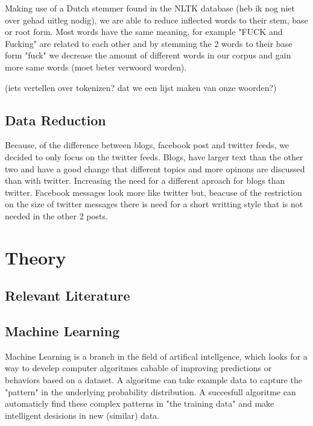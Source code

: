 \documentclass[11pt]{article}
\begin{document}
Making use of a Dutch stemmer found in the NLTK database (heb ik nog niet over gehad uitleg nodig), we are able to reduce inflected words to their stem, base or root form. Most words have the same meaning, for example "FUCK and Fucking"  are related to each other and by stemming the 2 words to their base form "fuck"  we decrease the amount of different words in our corpus and gain more same words (moet beter verwoord worden).

(iets vertellen over tokenizen? dat we een lijst maken van onze woorden?)

\subsection{Data Reduction}
Because, of the difference between blogs, facebook post and twitter feeds, we decided to only focus on the twitter feeds. 
Blogs, have larger text than the other two and have a good change that different topics and more opinons are discussed than with twitter. Increasing the need for a different aproach for blogs than twitter. 
Facebook messages look more like twitter but, beacuse of the restriction on the size of twitter messages there is need for a short writting style that is not needed in the other 2 posts. 





\section{Theory}
\subsection{Relevant Literature}

\subsection{Machine Learning} 
Machine Learning is a branch in the field of artifical intellgence, which looks for a way to develep computer algoritmes cabable of improving predictions or behaviors based on a dataset. A algoritme can take example data to capture the "pattern" in the underlying probability distribution. A succesfull algoritme can automaticly find these complex patterns in "the training data" and make intelligent desisions in new (similar) data.
\end{document}
